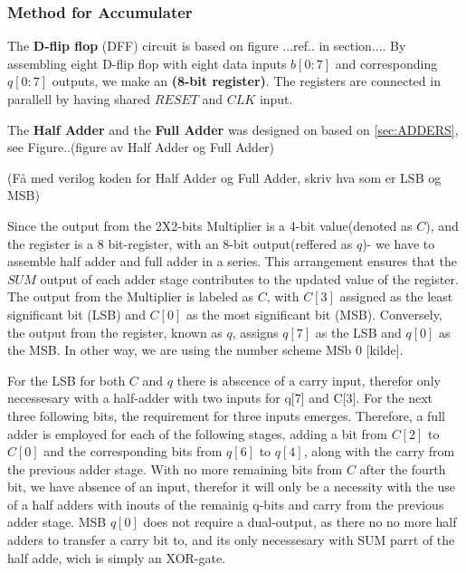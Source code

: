 \subsubsection{Method for Accumulater}

The \textbf{D-flip flop} (DFF) circuit is based on figure ...ref.. in section.... By assembling eight D-flip flop with eight data inputs $b[0:7]$ and corresponding $q[0:7]$ outputs, we make an \textbf{(8-bit register)}. The registers are connected in parallell by having shared $RESET$ and $CLK$ input. 


The \textbf{Half Adder} and the \textbf{Full Adder} was designed on based on \ref{sec:ADDERS}, see Figure..(figure av Half Adder og Full Adder)

(Få med verilog koden for Half Adder og Full Adder, skriv hva som er LSB og MSB)



Since the output from the 2X2-bits Multiplier is a 4-bit value(denoted as $C$), and the register is a 8 bit-register, with an 8-bit output(reffered as $q$)- we have to assemble half adder and full adder in a series. This arrangement ensures that the $SUM$ output of each adder stage contributes to the updated value of the register. The output from the Multiplier is labeled as $C$, with $C[3]$ assigned as the least significant bit (LSB) and $C[0]$ as the most significant bit (MSB). Conversely, the output from the register, known as $q$, assigns $q[7]$ as the LSB and $q[0]$ as the MSB. In other way, we are using the number scheme MSb 0 [kilde].

For the LSB for both $C$ and $q$ there is abscence of a carry input, therefor only necessesary with a half-adder with two inputs for q[7] and C[3]. For the next three following bits, the requirement for three inputs emerges. Therefore, a full adder is employed for each of the following stages, adding a bit from $C[2]$ to $C[0]$ and the corresponding bits from $q[6]$ to $q[4]$, along with the carry from the previous adder stage. With no more remaining bits from $C$ after the fourth bit, we have absence of an input, therefor it will only be a necessity with the use of a half adders with inouts of the remainig q-bits and carry from the previous adder stage. MSB $q[0]$ does not require a dual-output, as there no no more half adders to transfer a carry bit to, and its only necessesary with SUM parrt of the half adde, wich is simply an XOR-gate.

 





